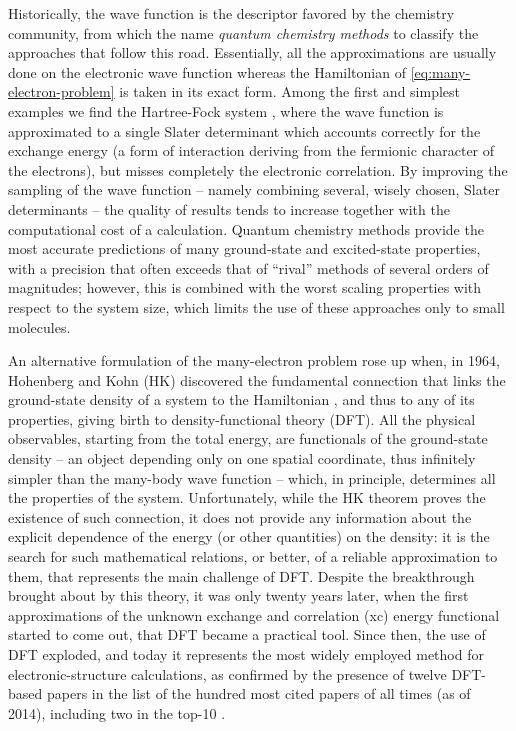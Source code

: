 Historically, the wave function is the descriptor favored by the chemistry community, from which the name \emph{quantum chemistry methods} to classify the approaches that follow this road. Essentially, all the approximations are usually done on the electronic wave function whereas the Hamiltonian of \cref{eq:many-electron-problem} is taken in its exact form. Among the first and simplest examples we find the Hartree-Fock system \cite{hartree_wave_1928,fock_naherungsmethode_1930}, where the wave function is approximated to a single Slater determinant which accounts correctly for the exchange energy (a form of interaction deriving from the fermionic character of the electrons), but misses completely the electronic correlation. By improving the sampling of the wave function -- namely combining several, wisely chosen, Slater determinants -- the quality of results tends to increase together with the computational cost of a calculation. Quantum chemistry methods provide the most accurate predictions of many ground-state and excited-state properties, with a precision that often exceeds that of ``rival'' methods of several orders of magnitudes; however, this is combined with the worst scaling properties with respect to the system size, which limits the use of these approaches only to small molecules.

An alternative formulation of the many-electron problem rose up when, in 1964, Hohenberg and Kohn (HK) discovered the fundamental connection that links the ground-state density of a system to the Hamiltonian \cite{hohenberg_inhomogeneous_1964}, and thus to any of its properties, giving birth to density-functional theory (DFT). All the physical observables, starting from the total energy, are functionals of the ground-state density -- an object depending only on one spatial coordinate, thus infinitely simpler than the many-body wave function -- which, in principle, determines all the properties of the system. Unfortunately, while the HK theorem proves the existence of such connection, it does not provide any information about the explicit dependence of the energy (or other quantities) on the density: it is the search for such mathematical relations, or better, of a reliable approximation to them, that represents the main challenge of DFT. Despite the breakthrough brought about by this theory, it was only twenty years later, when the first approximations of the unknown exchange and correlation (xc) energy functional started to come out, that DFT became a practical tool. Since then, the use of DFT exploded, and today it represents the most widely employed method for electronic-structure calculations, as confirmed by the presence of twelve DFT-based papers in the list of the hundred most cited papers of all times (as of 2014), including two in the top-10 \cite{van_noorden_top_2014}.

